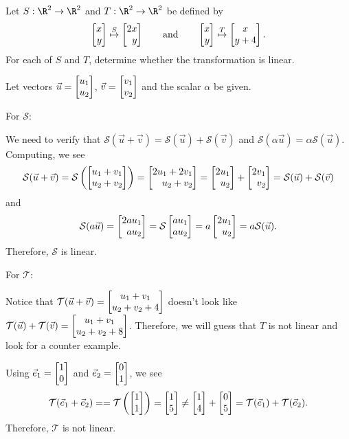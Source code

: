 \begin{example}
	Let $S:\R^2\to\R^2$ and $T:\R^2\to\R^2$ be defined by
	\[
		\mat{x\\y}\stackrel{S}{\mapsto}\mat{2x\\y}\qquad\text{and}\qquad
		\mat{x\\y}\stackrel{T}{\mapsto}\matc{x\\y+4}.
	\]
	For each of $S$ and $T$, determine whether the transformation is linear.
	
	Let vectors $\vec u=\mat{u_1\\u_2}$, $\vec v=\mat{v_1\\v_2}$ and the scalar $\alpha$ be given.

	For $\mathcal S$:
	
	We need to verify that $\mathcal S(\vec u+\vec v)=\mathcal S(\vec u)+\mathcal S(\vec v)$ and $\mathcal S(\alpha\vec u)=\alpha\mathcal S(\vec u)$. Computing, we see
	\[
	    \mathcal S(\vec u +\vec v)=\mathcal S\left(\mat{u_1+v_1\\u_2+v_2}\right)=\mat{2u_1+2v_1\\u_2+v_2}=\mat{2u_1\\u_2}+\mat{2v_1\\v_2}=\mathcal S(\vec u) + \mathcal S(\vec v)
	\]
	and
	\[
	    \mathcal S(a\vec u)=\mat{2a u_1\\a u_2}=\mathcal S\mat{a u_1\\a u_2}=a\mat{2 u_1\\ u_2}=a\mathcal S(\vec u).
	\]
	Therefore, $\mathcal S$ is linear.
	
	For $\mathcal T$:
	
	Notice that $\mathcal T(\vec u+\vec v)=\begin{bmatrix}u_1+v_1\\u_2+v_2+4\end{bmatrix}$ doesn't look like $\mathcal T(\vec u)+\mathcal T(\vec v)=\begin{bmatrix}u_1+v_1\\u_2+v_2+8\end{bmatrix}$. Therefore, we will guess that $T$ is not linear and look for a counter example. 
	
	Using $\xhat=\mat{1\\0}$ and $\yhat=\mat{0\\1}$, we see
	\[
	    \mathcal T(\xhat +\yhat)==\mathcal T\left(\mat{1\\1}\right)=\mat{1\\5} \neq \mat{1\\4}+\mat{0\\5}=\mathcal T(\xhat) + \mathcal T(\yhat).
	\]
	Therefore, $\mathcal T$ is not linear.
\end{example}

